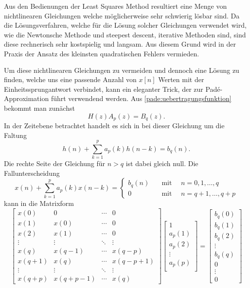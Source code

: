 Aus den Bedienungen der Least Squares Method resultiert eine Menge von nichtlinearen Gleichungen welche möglicherweise sehr schwierig lösbar sind.
Da die Lösungsverfahren, welche für die Lösung solcher Gleichungen
verwendet wird, wie die Newtonsche Methode und steepest descent, iterative
Methoden sind, sind diese rechnerisch sehr kostspielig und langsam.
Aus diesem Grund wird in der Praxis der Ansatz des kleinsten quadratischen Fehlers vermieden. 

Um diese nichtlinearen Gleichungen zu vermeiden und dennoch eine
Lösung zu finden, welche uns eine passende Anzahl von $x[n]$ Werten
mit der Einheitssprungantwort verbindet, kann ein eleganter Trick,
der zur Padé-Approximation führt verwendend werden.
Aus \eqref{pade:uebertragungsfunktion} bekommt man zunächst
\begin{equation}
H(z) A_{p}(z)=B_{q}(z).
\end{equation}
In der Zeitebene betrachtet handelt es sich in bei dieser Gleichung
um die Faltung
\begin{equation}
h(n)+\sum_{k=1}^{p} a_{p}(k) h(n-k)=b_{q}(n).
\end{equation}
Die rechte Seite der Gleichung für $n>q$ ist dabei gleich null.
Die Fallunterscheidung
\begin{equation}
x(n)+\sum_{k=1}^{p} a_{p}(k) x(n-k)
=
\begin{cases}
b_{q}(n) & 
\quad \text{mit } \quad n=0,1, \ldots, q \\
0 & 
\quad\text{mit } \quad n=q+1, \ldots, q+p
\end{cases}
\end{equation}
kann in die Matrixform 
\begin{equation}
\left[\begin{array}{cccc}
x(0) & 0 & \cdots & 0 \\
x(1) & x(0) & \cdots & 0 \\
x(2) & x(1) & \cdots & 0 \\
\vdots & \vdots & \ddots & \vdots \\
x(q) & x(q-1) & \cdots & x(q-p) \\
x(q+1) & x(q) & \cdots & x(q-p+1) \\
\vdots & \vdots &\ddots  & \vdots \\
x(q+p) & x(q+p-1) & \cdots & x(q)
\end{array}\right]
\left[\begin{array}{c}
1 \\
a_{p}(1) \\
a_{p}(2) \\
\vdots \\
a_{p}(p) \\
\end{array}\right]
=
\left[\begin{array}{c}
b_{q}(0) \\
b_{q}(1) \\
b_{q}(2) \\
\vdots \\
b_{q}(q) \\
0 \\
\vdots \\
0
\end{array}\right]
\end{equation}
